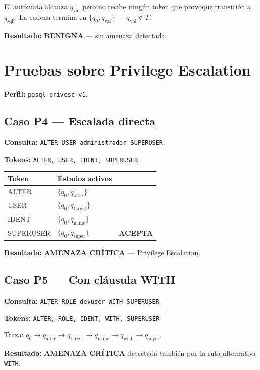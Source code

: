\documentclass[12pt, a4paper]{report}
\theoremstyle{definition}
\theoremstyle{remark}
\newcommand{\severity}[2]{\textbf{\color{#1}#2}}
\begin{document}
El autómata alcanza $q_{\text{val}}$ pero no recibe ningún token que
provoque transición a $q_{\text{sqli}}$. La cadena termina en
$\{q_0, q_{\text{val}}\}$ — $q_{\text{val}} \notin F$.

\textbf{Resultado:} \severity{success}{BENIGNA} — sin amenaza detectada. \checkmark

\section{Pruebas sobre Privilege Escalation}
\noindent\textbf{Perfil:} \texttt{pgsql-privesc-v1}.

\subsection{Caso P4 — Escalada directa}

\textbf{Consulta:} \texttt{ALTER USER administrador SUPERUSER}

\textbf{Tokens:} \texttt{ALTER, USER, IDENT, SUPERUSER}

\begin{center}
\begin{tabular}{lll}
  \toprule
  \textbf{Token} & \textbf{Estados activos} & \\
  \midrule
  ALTER     & $\{q_0, q_{\text{alter}}\}$  & \\
  USER      & $\{q_0, q_{\text{target}}\}$ & \\
  IDENT     & $\{q_0, q_{\text{name}}\}$   & \\
  SUPERUSER & $\{q_0, q_{\text{super}}\}$  & \textbf{ACEPTA} \\
  \bottomrule
\end{tabular}
\end{center}

\textbf{Resultado:} \severity{danger}{AMENAZA CRÍTICA} — Privilege Escalation.

\subsection{Caso P5 — Con cláusula WITH}

\textbf{Consulta:} \texttt{ALTER ROLE devuser WITH SUPERUSER}

\textbf{Tokens:} \texttt{ALTER, ROLE, IDENT, WITH, SUPERUSER}

Traza: $q_0 \to q_{\text{alter}} \to q_{\text{target}} \to q_{\text{name}}
\to q_{\text{with}} \to q_{\text{super}}$.

\textbf{Resultado:} \severity{danger}{AMENAZA CRÍTICA} detectada también por
la ruta alternativa \texttt{WITH}.
\end{document}
